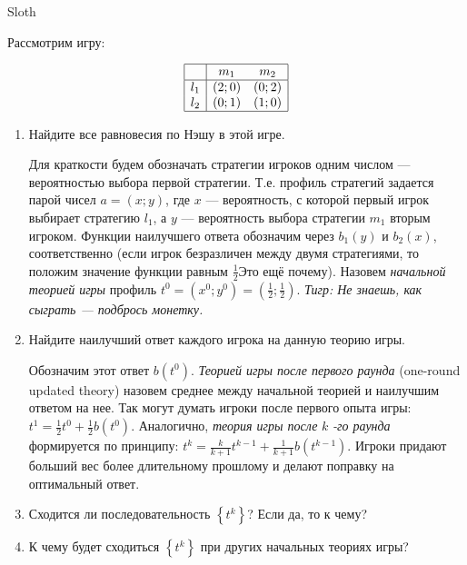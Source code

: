\begin{problem}\par
\begin{source}
Sloth
\end{source}
Рассмотрим игру:

\[\begin{array}{|c|cc|}  \hline {} & {m_{1} } & {m_{2} } \\  \hline {l_{1} } & {\left(2;0\right)} & {\left(0;2\right)} \\ {l_{2} } & {\left(0;1\right)} & {\left(1;0\right)} \\  \hline  \end{array}\]
\begin{enumerate}
\item Найдите все равновесия по Нэшу в этой игре.\par
Для краткости будем обозначать стратегии игроков одним числом — вероятностью выбора первой стратегии. Т.е. профиль стратегий задается парой чисел  $a=\left(x;y\right)$, где  $x$  — вероятность, с которой первый игрок выбирает стратегию  $l_{1} $, а  $y$  — вероятность выбора стратегии  $m_{1} $  вторым игроком. Функции наилучшего ответа обозначим через  $b_{1} \left(y\right)$  и  $b_{2} \left(x\right)$, соответственно (если игрок безразличен между двумя стратегиями, то положим значение функции равным $\frac{1}{2}${\red Это ещё почему}).
Назовем {\it начальной теорией игры} профиль  $t^{0} =\left(x^{0} ;y^{0} \right)=\left(\frac{1}{2} ;\frac{1}{2} \right)$. {\it Тигр: Не знаешь, как сыграть — подбрось монетку.} \par
\item Найдите наилучший ответ каждого игрока на данную теорию игры.\par
Обозначим этот ответ  $b\left(t^{0} \right)$. {\it Теорией игры после первого раунда} (one-round updated theory) назовем среднее между начальной теорией и наилучшим ответом на нее. Так могут думать игроки после первого опыта игры:  $t^{1} =\frac{1}{2} t^{0} +\frac{1}{2} b\left(t^{0} \right)$. Аналогично, {\it теория игры после } $k$ {\it -го раунда} формируется по принципу:  $t^{k} =\frac{k}{k+1} t^{k-1} +\frac{1}{k+1} b\left(t^{k-1} \right)$. Игроки придают больший вес более длительному прошлому и делают поправку на оптимальный ответ.\par
\item  Сходится ли последовательность  $\left\{t^{k} \right\}$? Если да, то к чему?\par
\item К чему будет сходиться  $\left\{t^{k} \right\}$  при других начальных теориях игры?\par

\end{enumerate}
\end{problem}
